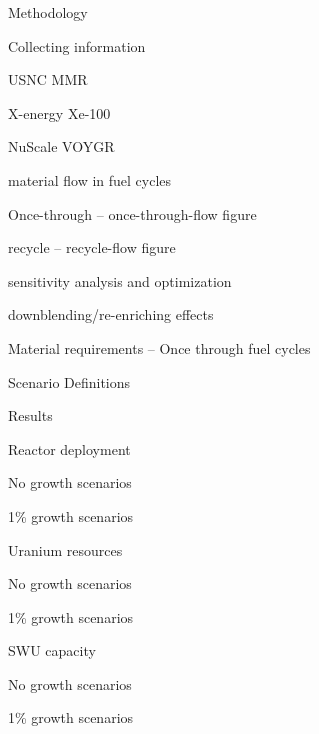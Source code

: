 \documentclass{report}
\begin{document}
\begin{outline}
\item Methodology
\begin{outline}
    \item Collecting information
    \begin{outline}
        \item USNC MMR \cite{hussain_advances_2018}
        \item X-energy Xe-100 \cite{harlan_x-energy_2018}
        \item NuScale VOYGR
    \end{outline}
    \item material flow in fuel cycles
    \begin{outline}
        \item Once-through -- once-through-flow figure
        \item recycle -- recycle-flow figure
    \end{outline}
    \item sensitivity analysis and optimization
    \item downblending/re-enriching effects
\end{outline}

\item Material requirements -- Once through fuel cycles
\begin{outline}
    \item Scenario Definitions
    \item Results
    \begin{outline}
        \item Reactor deployment
        \begin{outline}
            \item No growth scenarios
            \item 1\% growth scenarios
        \end{outline}
        \item Uranium resources
        \begin{outline}
            \item No growth scenarios
            \item 1\% growth scenarios
        \end{outline}
        \item SWU capacity
        \begin{outline}
            \item No growth scenarios
            \item 1\% growth scenarios
        \end{outline}
    \end{outline}
\end{outline}


\end{outline}
\end{document}
